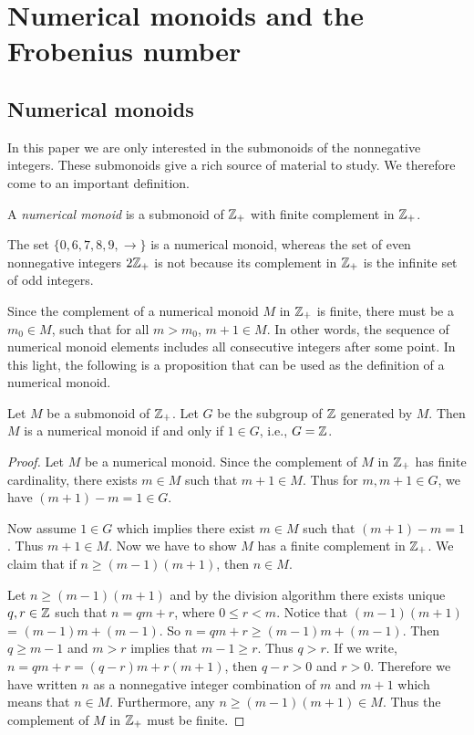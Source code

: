\chapter{Numerical monoids and the Frobenius number}

\section{Numerical monoids}

In this paper we are only interested in the submonoids of the nonnegative integers. These submonoids give a rich source of material to study. We therefore come to an important definition.

\begin{definition}\label{numerical monoid}
A \emph{numerical monoid} is a submonoid of $\mathbb{Z}_+$ with finite complement in $\mathbb{Z}_+$.
\end{definition}

The set $\{0, 6, 7, 8, 9, \rightarrow \}$ is a numerical monoid, whereas the set of even nonnegative integers $2 \mathbb{Z}_+$ is not because its complement in $\mathbb{Z}_+$ is the infinite set of odd integers. 

Since the complement of a numerical monoid $M$ in $\mathbb{Z}_+$ is finite, there must be a $m_0 \in M$, such that for all $m > m_0$, $m + 1 \in M$. In other words, the sequence of numerical monoid elements includes all consecutive integers after some point. In this light, the following is a proposition that can be used as the definition of a numerical monoid. 

\begin{proposition}\label{gcd}
Let $M$ be a submonoid of $\mathbb{Z}_+$. Let $G$ be the subgroup of $\mathbb{Z}$ generated by $M$. Then $M$ is a numerical monoid if and only if $1 \in G$, i.e., $G = \mathbb{Z}$.
\end{proposition}

\begin{proof}
Let $M$ be a numerical monoid. Since the complement of $M$ in $\mathbb{Z}_+$ has finite cardinality, there exists $m \in M$ such that $m + 1 \in M$. Thus for $m, m + 1 \in G$, we have $(m + 1) - m = 1 \in G$.

Now assume $1 \in G$ which implies there exist $m \in M$ such that $(m + 1) - m = 1$. Thus $m + 1 \in M$. Now we have to show $M$ has a finite complement in $\mathbb{Z}_+$. We claim that if $n \geq (m - 1)(m + 1)$, then $n \in M$. 

Let $n \geq (m - 1)(m + 1)$ and by the division algorithm there exists unique $q, r \in \mathbb{Z}$ such that $n = qm + r$, where $0 \leq r < m$. Notice that $(m - 1)(m + 1)$ = $(m - 1)m + (m - 1)$. So $n = qm + r \geq (m - 1)m + (m - 1)$. Then $q \geq m - 1$ and $m > r$ implies that $m - 1 \geq r$. Thus $q > r$. If we write, $n = qm + r = (q - r)m + r(m + 1)$, then $q - r > 0$ and $r > 0$. Therefore we have written $n$ as a nonnegative integer combination of $m$ and $m + 1$ which means that $n \in M$. Furthermore, any $n \geq (m - 1)(m + 1) \in M$. Thus the complement of $M$ in $\mathbb{Z}_+$ must be finite.
\end{proof}

